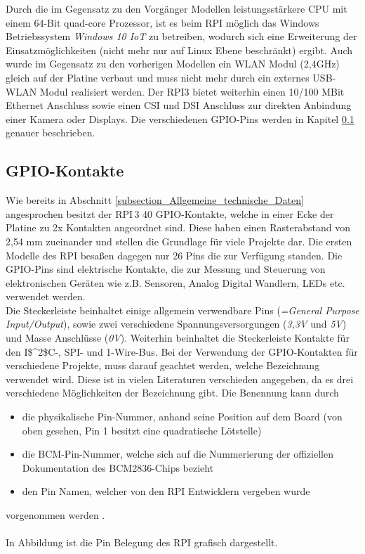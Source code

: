 Durch die im Gegensatz zu den Vorgänger Modellen leistungsstärkere CPU mit einem 64-Bit quad-core Prozessor, ist es beim RPI möglich das Windows Betriebssystem \textit{Windows 10 IoT} zu betreiben, wodurch sich eine Erweiterung der Einsatzmöglichkeiten (nicht mehr nur auf Linux Ebene beschränkt) ergibt. Auch wurde im Gegensatz zu den vorherigen Modellen  ein WLAN Modul (2,4\;GHz) gleich auf der Platine verbaut und muss nicht mehr durch ein externes USB-WLAN Modul realisiert werden. Der \ac{RPI}3 bietet weiterhin einen 10/100 MBit Ethernet Anschluss sowie einen \ac{CSI} und \ac{DSI} Anschluss zur direkten Anbindung einer Kamera oder Displays. Die verschiedenen GPIO-Pins werden in Kapitel \ref{subsection_GPIO} genauer beschrieben.

\subsection{GPIO-Kontakte}
\label{subsection_GPIO}
Wie bereits in Abschnitt \ref{subsection_Allgemeine_technische_Daten} angesprochen besitzt der \ac{RPI}\,3 40 GPIO-Kontakte, welche in einer Ecke der Platine zu 2\;x Kontakten angeordnet sind. Diese haben einen Rasterabstand von 2,54 mm zueinander und stellen die Grundlage für viele Projekte dar. Die ersten Modelle des \ac{RPI} besaßen dagegen nur 26 Pins die zur Verfügung standen. Die GPIO-Pins sind elektrische Kontakte, die zur Messung und Steuerung von elektronischen Geräten wie z.B. Sensoren, Analog Digital Wandlern, LEDs etc. verwendet werden.\\
Die Steckerleiste beinhaltet einige allgemein verwendbare Pins (\textit{=\;General Purpose Input\;/\;Output}), sowie zwei verschiedene Spannungsversorgungen (\textit{3,3\;V} und \textit{5\;V}) und Masse Anschlüsse (\textit{0\;V}). Weiterhin beinhaltet die Steckerleiste Kontakte für den \ac{I$^2$C}-, \ac{SPI}- und 1-Wire-Bus. Bei der Verwendung der GPIO-Kontakten für verschiedene Projekte, muss darauf geachtet werden, welche Bezeichnung verwendet wird. Diese ist in vielen Literaturen verschieden angegeben, da es drei verschiedene Möglichkeiten der Bezeichnung gibt. Die Benennung kann durch
\begin{itemize}
\item die physikalische Pin-Nummer, anhand seine Position auf dem Board (von oben gesehen, Pin 1 besitzt eine quadratische Lötstelle)
\item die BCM-Pin-Nummer, welche sich auf die Nummerierung der offiziellen Dokumentation des BCM2836-Chips bezieht
\item den Pin Namen, welcher von den \ac{RPI} Entwicklern vergeben wurde 
\end{itemize} 
vorgenommen werden \citep{Raspberri_Pi_Handbuch}.\\\\
In Abbildung ist die Pin Belegung des \ac{RPI} grafisch dargestellt.

